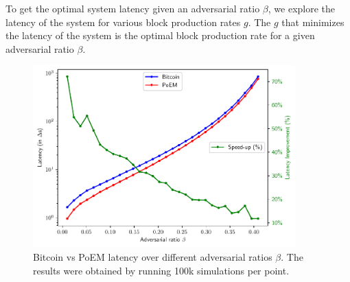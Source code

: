 To get the optimal system latency given an adversarial ratio $\beta$, we explore the latency of the system for various block production rates $g$.
The $g$ that minimizes the latency of the system is the optimal block production rate for a given adversarial ratio $\beta$.




%
%

\begin{figure}[pt]
    \centering
    \includegraphics[width = 0.9\textwidth]{figures/bitcoin_vs_poem.pdf}

    \caption{Bitcoin vs PoEM latency over different adversarial ratios $\beta$.
            The results were obtained by running 100k simulations per point.}
    \label{fig:bitcoin_vs_poem}
\end{figure}

